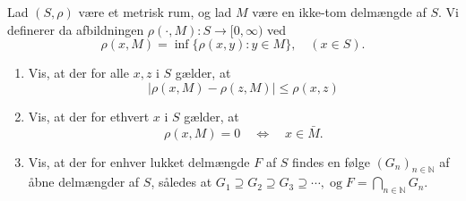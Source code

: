 \documentclass{Class}
\newcommand{\1}{\mathbbm{1}}
\theoremstyle{boxed}
\begin{document}
Lad $(S, \rho)$ være et metrisk rum, og lad $M$ være en ikke-tom delmængde af $S$. Vi definerer da afbildningen $\rho(\cdot, M): S \rightarrow[0, \infty)$ ved
$$
\rho(x, M)=\inf \{\rho(x, y): y \in M\}, \quad(x \in S) .
$$
\begin{enumerate}
  \item Vis, at der for alle $x, z$ i $S$ gælder, at
  $$
  |\rho(x, M)-\rho(z, M)| \leq \rho(x, z)
  $$
  \item Vis, at der for ethvert $x$ i $S$ gælder, at
  $$
  \rho(x, M)=0 \quad \Longleftrightarrow \quad x \in \bar{M} .
  $$
  \item Vis, at der for enhver lukket delmængde $F$ af $S$ findes en følge $\left(G_n\right)_{n \in \mathbb{N}}$ af åbne delmængder af $S$, således at $G_1 \supseteq G_2 \supseteq G_3 \supseteq \cdots, \operatorname{og} F=\bigcap_{n \in \mathbb{N}} G_n$.
\end{enumerate}
\solution
\end{document}

